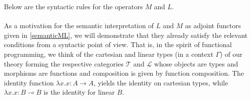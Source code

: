 Below are the syntactic rules for the operators $M$ and $L$. \\
\\
As a motivation for the semantic interpretation of $L$ and $M$ as adjoint functors given in \ref{semanticML}, we will demonstrate that they already satisfy the relevant conditions from a syntactic point of view. That is, in the spirit of functional programming, we think of the cartesian and linear types (in a context $\Gamma$) of our theory forming the respective categories $\mathcal{T}$ and $\mathcal{L}$ whose objects are types and morphisms are functions and composition is given by function composition. The identity function $\lambda x. x : A \to A$, yields the identity on cartesian types, while $\lambda x.x : B \multimap B$ is the identity for linear $B$.
